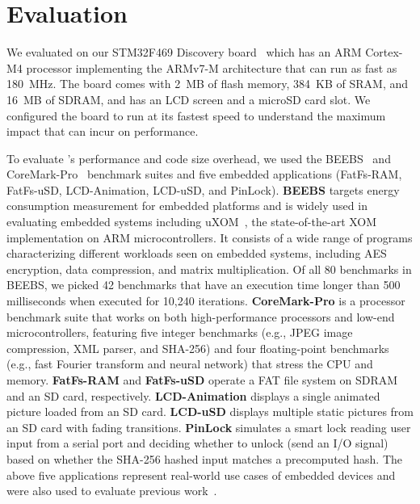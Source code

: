 \section{Evaluation}
\label{sec:eval}

We evaluated {\System} on our STM32F469 Discovery
board~\cite{STM32F469I-DISCO:Manual} which has an ARM Cortex-M4
processor implementing the ARMv7-M architecture that can run as fast as
180~MHz.  The board comes with 2~MB of
flash memory, 384~KB of SRAM, and 16~MB of SDRAM, and has an LCD screen
and a microSD card slot.  We configured the
board to run at its fastest speed to understand the maximum impact
that {\System} can incur on performance.



To evaluate {\System}'s performance and code size overhead, we used the
BEEBS~\cite{BEEBS:ArXiv13} and CoreMark-Pro~\cite{CoreMark-Pro}
benchmark suites and five embedded applications (FatFs-RAM,
FatFs-uSD, LCD-Animation, LCD-uSD, and PinLock).  {\bf BEEBS} targets
energy consumption measurement for embedded platforms and is widely used
in evaluating embedded systems including uXOM~\cite{uXOM:UsenixSec19},
the state-of-the-art XOM implementation on ARM microcontrollers.  It
consists of a wide range of programs characterizing different
workloads seen on embedded systems, including AES encryption, data
compression, and matrix multiplication.
Of all 80 benchmarks in BEEBS,
we picked 42 benchmarks that have an execution time
longer than 500 milliseconds when executed for 10,240 iterations.
{\bf CoreMark-Pro} is a
processor benchmark suite that works on both
high-performance processors and low-end microcontrollers, featuring five
integer benchmarks (e.g., JPEG image compression, XML parser, and
SHA-256) and four floating-point benchmarks (e.g., fast Fourier
transform and neural network) that stress the
CPU and memory.  {\bf FatFs-RAM} and {\bf FatFs-uSD} operate a FAT file
system on SDRAM and an SD card, respectively. {\bf LCD-Animation}
displays a single animated picture loaded from an SD card.
{\bf LCD-uSD} displays multiple static pictures from an SD card with
fading transitions.
{\bf PinLock} simulates a smart lock reading
user input from a serial port and deciding whether to unlock
(send an I/O signal) based on whether the SHA-256 hashed input matches
a precomputed hash.  The above five applications
represent real-world use cases of embedded devices and were also used
to evaluate previous work~\cite{EPOXY:Oakland17,ACES:UsenixSec18,uRAI:NDSS20}.

